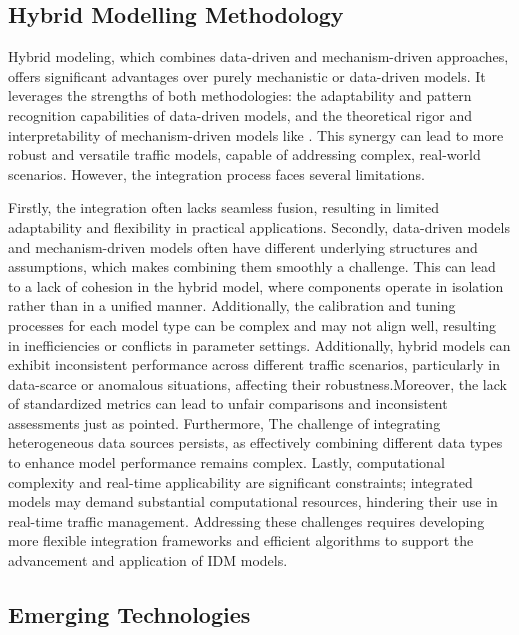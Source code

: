 \documentclass[a4paper,fleqn]{cas-sc}
\begin{document}
\subsection{Hybrid Modelling Methodology}

Hybrid modeling, which combines data-driven and mechanism-driven approaches, offers significant advantages over purely mechanistic or data-driven models. It leverages the strengths of both methodologies: the adaptability and pattern recognition capabilities of data-driven models, and the theoretical rigor and interpretability of mechanism-driven models like \citep{yuanMacroscopicTrafficFlowModeling2021,yuanModelingStochasticMicroscopicTraffic2020}. This synergy can lead to more robust and versatile traffic models, capable of addressing complex, real-world scenarios. However, the integration process faces several limitations.

Firstly, the integration often lacks seamless fusion, resulting in limited adaptability and flexibility in practical applications. Secondly, data-driven models and mechanism-driven models often have different underlying structures and assumptions, which makes combining them smoothly a challenge. This can lead to a lack of cohesion in the hybrid model, where components operate in isolation rather than in a unified manner. Additionally, the calibration and tuning processes for each model type can be complex and may not align well, resulting in inefficiencies or conflicts in parameter settings.  Additionally, hybrid models can exhibit inconsistent performance across different traffic scenarios, particularly in data-scarce or anomalous situations, affecting their robustness.Moreover, the lack of standardized metrics can lead to unfair comparisons and inconsistent assessments just as \cite{wangComparingHundredsMachineLearning2024} pointed.  Furthermore, The challenge of integrating heterogeneous data sources persists, as effectively combining different data types to enhance model performance remains complex. Lastly, computational complexity and real-time applicability are significant constraints; integrated models may demand substantial computational resources, hindering their use in real-time traffic management. Addressing these challenges requires developing more flexible integration frameworks and efficient algorithms to support the advancement and application of IDM models.

\subsection{Emerging Technologies}
\end{document}
